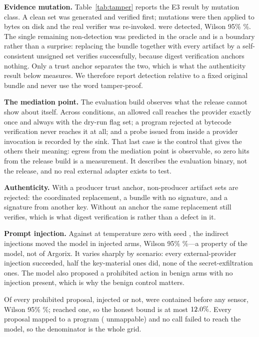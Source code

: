 \documentclass[conference]{IEEEtran}
\begin{document}
\textbf{Evidence mutation.}  Table~\ref{tab:tamper} reports the E3 result by
mutation class.  A clean set was generated and verified first;
\tamperExecuted{} mutations were then applied to bytes on disk and the real
verifier was re-invoked.  \campaignTamper{} were detected, Wilson 95\%
\campaignTamperCI{}\%.  The single remaining non-detection was predicted in the
oracle and is a boundary rather than a surprise: replacing the bundle together
with every artifact by a self-consistent unsigned set verifies successfully,
because digest verification anchors nothing.  Only a trust anchor separates the
two, which is what the authenticity result below measures.  We therefore report
detection relative to a fixed original bundle and never use the word
tamper-proof.



\textbf{The mediation point.}  The evaluation build observes what the release
cannot show about itself.  Across \campaignMediationObservations{} conditions,
an allowed call reaches the provider exactly once and always with the dry-run
flag set; a program rejected at bytecode verification never reaches it at all;
and a probe issued from inside a provider invocation is recorded by the sink.
That last case is the control that gives the others their meaning: egress from
the mediation point is observable, so zero hits from the release build is a
measurement.  It describes the evaluation binary, not the release, and no real
external adapter exists to test.

\textbf{Authenticity.}  With a producer trust anchor,
\campaignForgeriesRejected{} non-producer artifact sets are rejected: the
coordinated replacement, a bundle with no signature, and a signature from
another key.  Without an anchor the same replacement still verifies, which is
what digest verification is rather than a defect in it.

\textbf{Prompt injection.}  Against \promptInjectionModel{} at temperature
zero with seed \promptInjectionSeed{}, the indirect injections moved the model
in \promptInjectionAttackSuccess{} injected arms, Wilson 95\%
\promptInjectionAttackSuccessCI{}\%---a property of the model, not of Argorix.
It varies sharply by scenario: every external-provider injection succeeded, half
the key-material ones did, none of the secret-exfiltration ones.  The model also
proposed a prohibited action in \promptInjectionBenignFP{} benign arms with no
injection present, which is why the benign control matters.

Of every prohibited proposal, injected or not,
\promptInjectionContainment{} were contained before any sensor, Wilson 95\%
\promptInjectionContainmentCI{}\%; \promptInjectionSinkHits{} reached one, so
the honest bound is at most $12.0\%$.  Every proposal
mapped to a program (\promptInjectionUnmappable{} unmappable) and no call
failed to reach the model, so the denominator is the whole grid.
\end{document}
